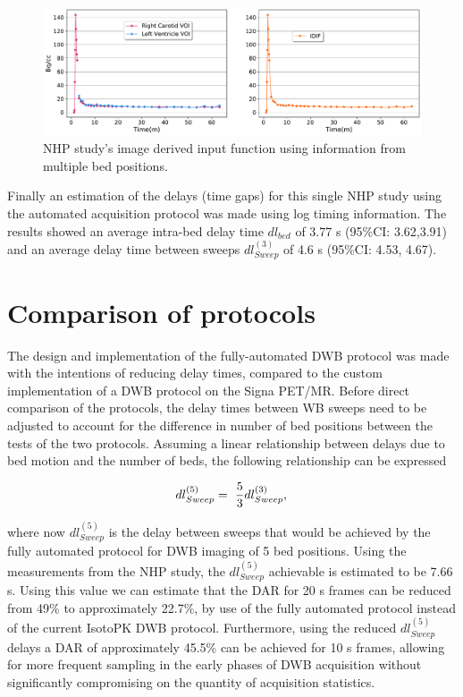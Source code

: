 %
%
\begin{figure} [ht!]
\centering
\includegraphics[scale=0.45,angle=0]{3_Results/3_1_DWB_Optimization/figures/3_1_NHP_InputFunction.pdf}
\caption{NHP study's image derived input function using information from multiple bed positions.}
\label{fig3_1:Macaque_PET_input_function}
\end{figure}
%
Finally an estimation of the delays (time gaps) for this single NHP study using the automated acquisition protocol was made using log timing information. The results showed an average intra-bed delay time $dl_{bed}$ of 3.77 s (95\%CI: 3.62,3.91) and an average delay time between sweeps $dl_{Sweep}^{(3)}$ of 4.6 s (95\%CI: 4.53, 4.67). 

\section{Comparison of protocols}
The design and implementation of the fully-automated DWB protocol was made with the intentions of reducing delay times, compared to the custom implementation of a DWB protocol on the Signa PET/MR. 
Before direct comparison of the protocols, the delay times between WB sweeps need to be adjusted to account for the difference in number of bed positions between the tests of the two protocols. 
Assuming a linear relationship between delays due to bed motion and the number of beds, the following relationship can be expressed

\begin{equation} \label{eqn:acq_to_dead_time_ratio}
dl_{{Sweep}}^{(5)} =\ \frac{5}{3} dl_{{Sweep}}^{(3)}  \\ , \\ 
\end{equation}

where now $dl_{Sweep}^{(5)}$ is the delay between sweeps that would be achieved by the fully automated protocol for DWB imaging of 5 bed positions. 
Using the measurements from the NHP study, the $dl_{Sweep}^{(5)}$ achievable is estimated to be 7.66 s. 
Using this value we can estimate that the DAR for 20 s frames can be reduced from 49\% to approximately 22.7\%, by use of the fully automated protocol instead of the current IsotoPK DWB protocol. Furthermore, using the reduced $dl_{Sweep}^{(5)}$ delays a DAR of approximately 45.5\% can be achieved for 10 s frames, allowing for more frequent sampling in the early phases of DWB acquisition without significantly compromising on the quantity of acquisition statistics. 


